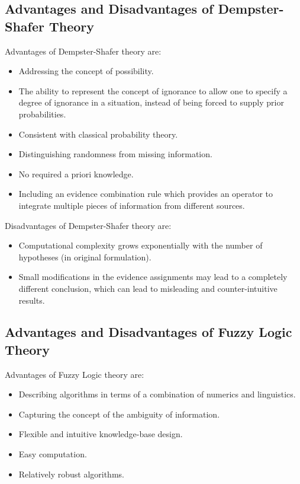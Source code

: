 \documentclass[11pt]{article}
\begin{document}
\subsection{Advantages and Disadvantages of Dempster-Shafer Theory}

Advantages of Dempster-Shafer theory are:

\begin{itemize}
  \item Addressing the concept of possibility.
  
  \item The ability to represent the concept of ignorance to allow one to
  specify a degree of ignorance in a situation, instead of being forced to
  supply prior probabilities.
  
  \item Consistent with classical probability theory.
  
  \item Distinguishing randomness from missing information.
  
  \item No required a priori knowledge.
  
  \item Including an evidence combination rule which provides an operator to
  integrate multiple pieces of information from different sources.
\end{itemize}

\noindent Disadvantages of Dempster-Shafer theory are:

\begin{itemize}
  \item Computational complexity grows exponentially with the number of
  hypotheses (in original formulation).
  
  \item Small modifications in the evidence assignments may lead to a
  completely different conclusion, which can lead to misleading and
  counter-intuitive results.
\end{itemize}

\subsection{Advantages and Disadvantages of Fuzzy Logic Theory}

Advantages of Fuzzy Logic theory are:

\begin{itemize}
  \item Describing algorithms in terms of a combination of numerics and
  linguistics.
  \item Capturing the concept of the ambiguity of information.
  \item Flexible and intuitive knowledge-base design.
  \item Easy computation.
  \item Relatively robust algorithms.
\end{itemize}
\end{document}
